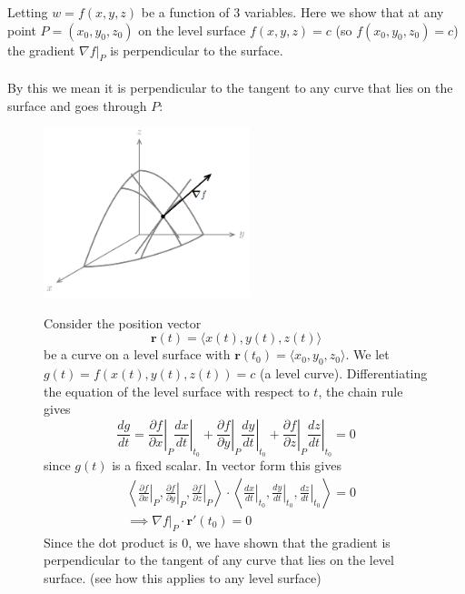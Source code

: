 \documentclass{report}
\begin{document}
Letting $w=f(x,y,z)$ be a function of 3 variables. Here we show that at any point $P=(x_0,y_0,z_0)$ on the 
level surface $f(x,y,z)=c$ (so $f(x_0,y_0,z_0)=c$) the 
gradient $\nabla f|_P$ is perpendicular to the surface.\\
\vspace{1mm}\\
By this we mean it is perpendicular to the tangent to any curve that lies on the surface and goes through $P$:
\begin{figure}[h]
\begin{center}
\includegraphics[width=6cm]{103}\\
\end{center}
Consider the position vector
\begin{equation*}
\bm{r}(t)=\langle x(t),y(t),z(t)\rangle
\end{equation*}
be a curve on a level surface with $\bm{r}(t_0)=\langle x_0,y_0,z_0\rangle$. 
We let $g(t)=f(x(t),y(t),z(t))=c$ (a level curve).
Differentiating the equation of the level surface with respect to $t$, the chain rule gives
\begin{equation*}
\frac{dg}{dt}=\left.\frac{\partial f}{\partial x}\right|_P
\left.\frac{dx}{dt}\right|_{t_0}+
\left.\frac{\partial f}{\partial y}\right|_P\left.\frac{dy}{dt}\right|_{t_0}+
\left.\frac{\partial f}{\partial z}\right|_P\left.\frac{dz}{dt}\right|_{t_0}=0
\end{equation*}
since $g(t)$ is a fixed scalar. In vector form this gives
\begin{align*}
&\left\langle\left.\frac{\partial f}{\partial x}\right|_P,
\left.\frac{\partial f}{\partial y}\right|_P,
\left.\frac{\partial f}{\partial z}\right|_P\right\rangle
\cdot\left\langle\left.\frac{dx}{dt}\right|_{t_0},
\left.\frac{dy}{dt}\right|_{t_0},
\left.\frac{dz}{dt}\right|_{t_0}\right\rangle=0\\
&\implies\nabla f|_P\cdot\bm{r}'(t_0)=0
\end{align*}
Since the dot product is 0, we have shown that the gradient is perpendicular to the tangent of any curve that
lies on the level surface. (see how this applies to
any level surface)
\end{figure}
\newpage

\subsection{}
\end{document}
